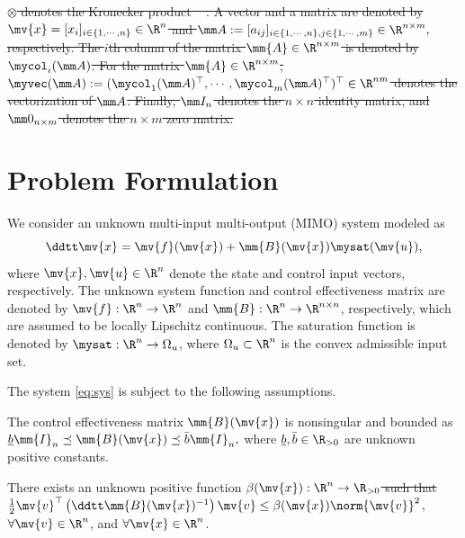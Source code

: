 \documentclass[letterpaper, journal]{IEEEtran}
\providecommand{\DIFadd}[1]{{\protect\color{blue}\uwave{#1}}} %
\providecommand{\DIFdel}[1]{{\protect\color{red}\sout{#1}}} %
\providecommand{\DIFaddbegin}{} %
\providecommand{\DIFaddend}{} %
\providecommand{\DIFdelbegin}{} %
\providecommand{\DIFdelend}{} %
\begin{document}
\DIFdel{$\otimes$ denotes the Kronecker product \mbox{%
\cite[Chap. 7, Def. 7.1.2]{Bernstein:2009aa}}\hskip0pt%
.
A vector and a matrix are denoted by $\mv{x}=[x_i]_{i\in\{1,\cdots,n\}}\in\R^n$ and 
$
  \mm A
  := 
  [a_{ij}]_{
    i\in\{1,\cdots,n\},j\in\{1,\cdots ,m\}
  }\in\R^{n\times m}
  ,
$
respectively.
The $i$th column of the matrix $\mm{A}\in\R^{n\times m}$ is denoted by $\mycol_i(\mm A)$.
For the matrix $\mm{A}\in\R^{n\times m}$, $\myvec(\mm A):=(\mycol_1(\mm A)^\top,\cdots,\mycol_m(\mm A)^\top )^\top\in\R^{nm}$ denotes the vectorization of $\mm A$.
Finally, $\mm I_n$ denotes the $n\times n$ identity matrix, and $\mm 0_{n\times m}$ denotes the $n\times m$ zero matrix.
}%

\DIFdelend %
\section{Problem Formulation} \label{sec:problem:formulation}

We consider an unknown multi-input multi-output (MIMO) system modeled as 
\begin{equation} \label{eq:sys}
  \ddtt\mv{x} 
  = 
  \mv{f}(\mv{x}) 
  + 
  \mm{B}(\mv{x})\mysat(\mv{u})
  ,
\end{equation}
where $\mv{x},\mv{u}\in\R^n$ denote the state and control input vectors, respectively.
The unknown system function and control effectiveness matrix are denoted by $\mv{f}:\R^n\to\R^n$ and $\mm{B}:\R^n\to\R^{n\times n}$, respectively, which are assumed to be locally Lipschitz continuous.
The saturation function is denoted by $\mysat:\R^n\to\Omega_u$, where $\Omega_u\subset\R^n$ is the convex admissible input set.

The system \eqref{eq:sys} is subject to the following assumptions.

\begin{assum} \label{assum:B:bound}
  The control effectiveness matrix $\mm{B}(\mv{x})$ is nonsingular and bounded as   
  $
    \underline{b}\mm{I}_n
    \preceq 
    \mm{B}(\mv{x})
    \preceq 
    \bar{b}\mm{I}_n
    ,
  $
  where $\underline{b},\bar{b}\in\R_{>0}$ are unknown positive constants.
\end{assum}

\DIFdelbegin %
\DIFdelend \DIFaddbegin \begin{assum} \DIFaddend \label{assum:B:bound:grad}
  There exists an unknown positive function \DIFdelbegin \DIFdel{$\beta(\mv{x}):\R^n\to\R_{>0}$ such that $\tfrac{1}{2}\mv{v}^\top\left(\ddtt\mm{B}(\mv{x})^{-1}\right)\mv{v} \le \beta(\mv{x})\norm{\mv{v}}^2$}\DIFdelend \DIFaddbegin \DIFadd{$\rho_{\beta}(\mv{x}):\R^n\to\R_{>0}$ such that $\tfrac{1}{2}\mv{v}^\top\left(\ddtt\mm{B}(\mv{x})^{-1}\right)\mv{v} \le \rho_{\beta}(\mv{x})\norm{\mv{v}}^2$}\DIFaddend , $\forall \mv{v}\in\R^n$, and $\forall \mv{x}\in\R^n$. 
\end{assum}
\end{document}
